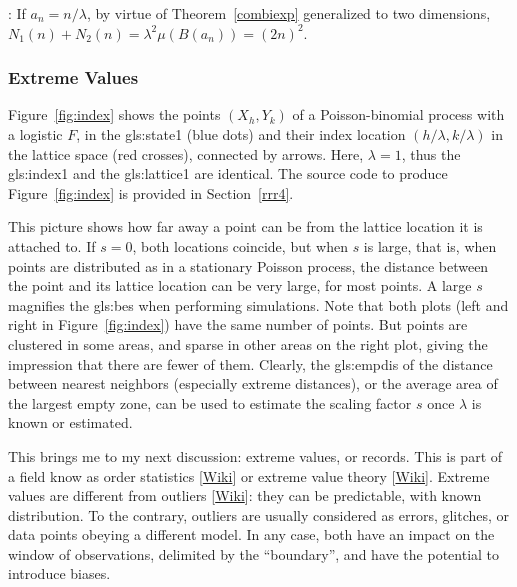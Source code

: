 \documentclass[10pt]{article}
\begin{document}
: If $a_n=n/\lambda$, by virtue of Theorem~\ref{combiexp} generalized to two dimensions, $N_1(n)+N_2(n)= \lambda^2 \mu(B(a_n))= (2n)^2$.


\subsubsection{Extreme Values}\label{sev45}

Figure~\ref{fig:index} shows the points $(X_h,Y_k)$ of a Poisson-binomial process with a logistic $F$, in the \gls{gls:state1} (blue dots) and their 
index location $(h/\lambda,k/\lambda)$ in the lattice space (red crosses), connected by arrows. Here, $\lambda=1$, thus the \gls{gls:index1} and the \gls{gls:lattice1} are identical.  The source code to produce Figure~\ref{fig:index} is provided in Section~\ref{rrr4}.

This picture shows how far away a point can be from the lattice location it is attached to. If $s=0$, both locations coincide, but when $s$ is large, that is, when points are distributed as in
a \textcolor{index}{stationary Poisson process},  the distance between the point and its lattice location can be very large, for most points. A large $s$ magnifies the 
\glspl{gls:be} when performing simulations.
Note that both plots (left and right in Figure~\ref{fig:index}) have the same number of points. But points are clustered in some areas, and sparse in other areas on the right plot, giving the impression that there are fewer of them. Clearly, the  \gls{gls:empdis} of  the distance between nearest neighbors (especially extreme distances), or the average area of the largest empty zone, can be used to estimate the \textcolor{index}{scaling factor} $s$ once $\lambda$ is known or estimated.

This brings me to my next discussion: \textcolor{index}{extreme values}, or \textcolor{index}{records}. This is part of a field know as 
\textcolor{index}{order statistics} [\href{https://en.wikipedia.org/wiki/Order_statistic}{Wiki}] or extreme value theory [\href{https://en.wikipedia.org/wiki/Extreme_value_theory}{Wiki}]. Extreme values are different from \textcolor{index}{outliers} [\href{https://en.wikipedia.org/wiki/Outlier}{Wiki}]: 
they can be predictable, with known distribution. To the contrary, outliers are usually considered as errors, glitches, or data points obeying a different model. In any case, both have an impact
on the window of observations, delimited by the ``boundary'', and have the potential to introduce biases. 
\end{document}
